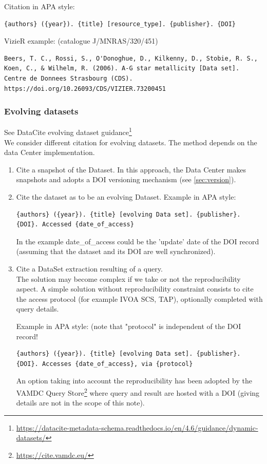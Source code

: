 \documentclass[11pt,a4paper]{ivoa}
\begin{document}
Citation in APA style:
\begin{verbatim}
{authors} ({year}). {title} [resource_type]. {publisher}. {DOI}
\end{verbatim}

VizieR example: (catalogue J/MNRAS/320/451)
\begin{verbatim}
Beers, T. C., Rossi, S., O'Donoghue, D., Kilkenny, D., Stobie, R. S.,
Koen, C., & Wilhelm, R. (2006). A-G star metallicity [Data set]. 
Centre de Donnees Strasbourg (CDS). https://doi.org/10.26093/CDS/VIZIER.73200451
\end{verbatim}

\subsubsection{Evolving datasets}

See DataCite evolving dataset guidance\footnote{\url{https://datacite-metadata-schema.readthedocs.io/en/4.6/guidance/dynamic-datasets/}}\\

We consider different citation for evolving datasets. The method depends on the data Center implementation.

\begin{enumerate}
  \item Cite a snapshot of the Dataset. In this approach, the Data Center makes snapshots and adopts a DOI versioning mechanism (see \ref{sec:version}).
  \item  Cite the dataset as to be an evolving Dataset.
         Example in APA style:
\begin{verbatim}
{authors} ({year}). {title} [evolving Data set]. {publisher}.
{DOI}. Accessed {date_of_access}
\end{verbatim}

		In the example {date\_of\_access} could be the 'update' date of the DOI record (assuming that the dataset and its DOI are well synchronized).

	\item Cite a DataSet extraction resulting of a query.\\ 
	The solution may become complex if we take or not the reproducibility aspect.
	A simple solution without reproducibility constraint consists to cite the access protocol (for example IVOA SCS, TAP), optionally completed with query details.

	Example in APA style: (note that "protocol" is independent of the DOI record!
\begin{verbatim}
{authors} ({year}). {title} [evolving Data set]. {publisher}. 
{DOI}. Accesses {date_of_access}, via {protocol}	
\end{verbatim}

	An option taking into account the reproducibility has been adopted by the VAMDC Query Store\footnote{\url{https://cite.vamdc.eu/}} where query and result are hosted with a DOI (giving details are not in the scope of this note).
\end{enumerate}
\end{document}
